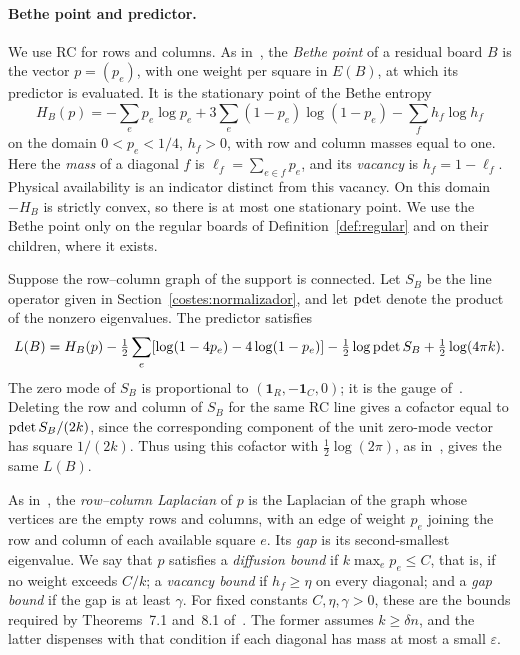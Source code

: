 \paragraph{Bethe point and predictor.}
We use RC for rows and columns. As in~\cite{pred}, the \emph{Bethe point} of a residual board $B$ is the
vector $p=(p_e)$, with one weight per square in $E(B)$, at which its predictor is evaluated. It is the
stationary point of the Bethe entropy
\begin{equation}\label{bethe}
 H_B(p)=-\sum_e p_e\log p_e
       +3\sum_e(1-p_e)\log(1-p_e)-\sum_fh_f\log h_f
\end{equation}
on the domain $0<p_e<1/4$, $h_f>0$, with row and column masses equal to one. Here the \emph{mass} of a
diagonal $f$ is $\ell_f=\sum_{e\in f}p_e$, and its \emph{vacancy} is $h_f=1-\ell_f$. Physical availability
is an indicator distinct from this vacancy. On this domain $-H_B$ is strictly convex, so there is at most
one stationary point. We use the Bethe point only on the regular boards of Definition~\ref{def:regular}
and on their children, where it exists.

Suppose the row--column graph of the support is connected. Let $S_B$ be the line operator given in
Section~\ref{costes:normalizador}, and let $\operatorname{pdet}$ denote the product of the nonzero eigenvalues. The
predictor satisfies
\[
 L(B)=H_B(p)-\tfrac12\sum_e[\log(1-4p_e)-4\log(1-p_e)]
             -\tfrac12\log\operatorname{pdet} S_B+\tfrac12\log(4\pi k).
\]
The zero mode of $S_B$ is proportional to $(\mathbf1_R,-\mathbf1_C,0)$; it is the gauge of~\cite{pred}.
Deleting the row and column of $S_B$ for the same RC line gives a cofactor equal to $\operatorname{pdet} S_B/(2k)$,
since the corresponding component of the unit zero-mode vector has square $1/(2k)$. Thus using this
cofactor with $\tfrac12\log(2\pi)$, as in~\cite[Sections~6.1 and~7.1]{pred}, gives the same $L(B)$.

As in~\cite{pred}, the \emph{row--column Laplacian} of $p$ is the Laplacian of the graph whose vertices
are the empty rows and columns, with an edge of weight $p_e$ joining the row and column of each available
square $e$. Its \emph{gap} is its second-smallest eigenvalue. We say that $p$ satisfies a \emph{diffusion
bound} if $k\max_ep_e\le C$, that is, if no weight exceeds $C/k$; a \emph{vacancy bound} if $h_f\ge\eta$
on every diagonal; and a \emph{gap bound} if the gap is at least $\gamma$. For fixed constants
$C,\eta,\gamma>0$, these are the bounds required by Theorems~7.1 and~8.1 of~\cite{pred}. The former
assumes $k\ge\delta n$, and the latter dispenses with that condition if each diagonal has mass at most a
small $\varepsilon$.

